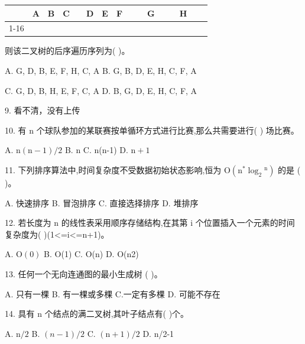 \begin{center}
\begin{tabular}{|c|c|c|c|c|c|c|c|c|c|c|c|c|c|c|c|}
\hline
\phantom{X} & A & B & C & \phantom{X} & D & E & F & \phantom{X} & \phantom{X} & G & \phantom{X} & \phantom{X} & H & \phantom{X} & \phantom{X} \\
\cline{1-16}
\hline
\end{tabular}
\end{center}

则该二叉树的后序遍历序列为(   )。

A. G, D, B, E, F, H, C, A B. G, B, D, E, H, C, F, A

C. G, D, B, H, E, F, C, A D. B, G, D, E, H, C, F, A

9. 看不清，没有上传






10. 有 n 个球队参加的某联赛按单循环方式进行比赛,那么共需要进行(   ) 场比赛。

A. \(\mathrm{n}\left( {\mathrm{n} - 1}\right) /2\) B. n C. n(n-1) D. \(\mathrm{n} + 1\)

11. 下列排序算法中,时间复杂度不受数据初始状态影响,恒为 \(\mathrm{O}\left( {{\mathrm{n}}^{ * }{\log }_{2}{}^{\mathrm{n}}}\right)\) 的是 (   )。

A. 快速排序 B. 冒泡排序 C. 直接选择排序 D. 堆排序

12. 若长度为 \(\mathrm{n}\) 的线性表采用顺序存储结构,在其第 \(\mathrm{i}\) 个位置插入一个元素的时间复杂度为(   )(1<=i<=n+1)。

A. \(\mathrm{O}\left( 0\right)\) B. O(1) C. O(n) D. O(n2)

13. 任何一个无向连通图的最小生成树 (   )。

A. 只有一棵 B. 有一棵或多棵 C.一定有多棵 D. 可能不存在

14. 具有 n 个结点的满二叉树,其叶子结点有(   )个。

A. \(\mathrm{n}/2\) B. \(\left( {n - 1}\right) /2\) C. \(\left( {\mathrm{n} + 1}\right) /2\) D. n/2-1

